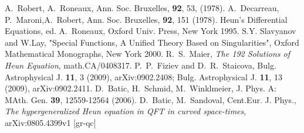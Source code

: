 \documentclass[prd,aps,twocolumn,leterpaper,preprintnumbers]{revtex4}
\numberwithin{equation}{section}
\begin{document}
\begin{thebibliography}{}
                    A.~Robert, A.~Roneaux,  Ann. Soc. Bruxelles, {\bf
                    92}, 53, (1978).
                    A.~Decarreau, P.~Maroni,A.~Robert,  Ann. Soc. Bruxelles, {\bf
                    92}, 151 (1978).
                    {Heun's Differential Equations}, ed. A.~Roneaux,
                    Oxford Univ. Press, New York 1995.
                    S.Y. Slavyanov and W.Lay,  "Special Functions,
                    A Unified Theory Based on Singularities",
                    Oxford Mathematical Monographs, New York 2000.
                    R.~S.~Maier, {\em The 192 Solutions of Heun
                    Equation}, math.CA/0408317.
%
      P.~P.~Fiziev and D.~R.~Staicova, Bulg. Astrophysical J. {\bf 11}, 3  (2009), arXiv:0902.2408;
                                                     Bulg. Astrophysical J. {\bf 11}, 13 (2009), arXiv:0902.2411.
%
   D.~Batic, H.~Schmid, M.~Winklmeier, J. Phys. A: MAth. Gen. {\bf 39}, 12559-12564 (2006).
                  D.~Batic, M.~Sandoval, Cent.Eur. J. Phys.,
                  {\em The hypergeneralized Heun equation in QFT in curved space-times}, arXiv:0805.4399v1 [gr-qc]
%
\end{thebibliography}
\end{document}
